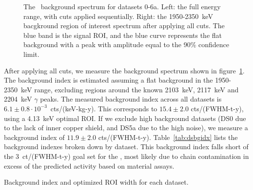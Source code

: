 \documentclass[/main.tex]{subfiles}
\begin{document}
\begin{figure}
  \centering
  \caption[\MJD\ background spectrum]{\label{mjdbgspectrum}
    The \MJD\ background spectrum for datasets 0-6a. Left: the full energy range, with cuts applied sequentially. Right: the 1950-2350~keV bacgkround region of interest spectrum after applying all cuts. The blue band is the signal ROI, and the blue curve represents the flat background with a peak with amplitude equal to the 90\% confidence limit.
  }
\end{figure}
After applying all cuts, we measure the background spectrum shown in figure~\ref{mjdbgspectrum}.
The background index is estimated assuming a flat background in the 1950-2350~keV range, excluding regions around the known 2103~keV, 2117~keV and 2204~keV $\gamma$ peaks.
The measured background index across all datasets is $6.1\pm0.8\cdot10^{-3}$~cts/(keV-kg-y).
This corresponds to $15.4\pm2.0$ cts/(FWHM-t-y), using a 4.13~keV optimal ROI.
If we exclude high background datasets (DS0 due to the lack of inner copper shield, and DS5a due to the high noise), we measure a background index of $11.9\pm2.0$ cts/(FWHM-t-y).
Table~\ref{tab:dsbgidx} lists the background indexes broken down by dataset.
This background index falls short of the 3~ct/(FWHM-t-y) goal set for the \MJD, most likely due to  chain contamination in excess of the predicted activity based on material assays.
\begin{table}[h]
  \centering
  \caption[Summary of datasets]{\label{tab:dsbgidx}
    Background index and optimized ROI width for each dataset.
  }
  \footnotesize
  
\end{table}
\end{document}
